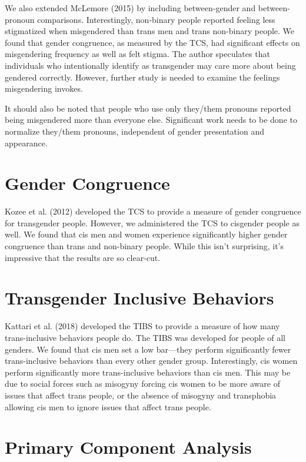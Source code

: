 \documentclass[12pt,twoside]{reedthesis}
\begin{document}
We also extended McLemore (2015) by including between-gender and between-pronoun comparisons. Interestingly, non-binary people reported feeling less stigmatized when misgendered than trans men and trans non-binary people. We found that gender congruence, as measured by the TCS, had significant effects on misgendering frequency as well as felt stigma. The author speculates that individuals who intentionally identify as transgender may care more about being gendered correctly. However, further study is needed to examine the feelings misgendering invokes.

It should also be noted that people who use only they/them pronouns reported being misgendered more than everyone else. Significant work needs to be done to normalize they/them pronouns, independent of gender presentation and appearance.

\hypertarget{gender-congruence-1}{%
\section{Gender Congruence}\label{gender-congruence-1}}

Kozee et al. (2012) developed the TCS to provide a measure of gender congruence for transgender people. However, we administered the TCS to cisgender people as well. We found that cis men and women experience significantly higher gender congruence than trans and non-binary people. While this isn't surprising, it's impressive that the results are so clear-cut.

\hypertarget{transgender-inclusive-behaviors-1}{%
\section{Transgender Inclusive Behaviors}\label{transgender-inclusive-behaviors-1}}

Kattari et al. (2018) developed the TIBS to provide a measure of how many trans-inclusive behaviors people do. The TIBS was developed for people of all genders. We found that cis men set a low bar---they perform significantly fewer trans-inclusive behaviors than every other gender group. Interestingly, cis women perform significantly more trans-inclusive behaviors than cis men. This may be due to social forces such as misogyny forcing cis women to be more aware of issues that affect trans people, or the absence of misogyny and transphobia allowing cis men to ignore issues that affect trans people.

\hypertarget{primary-component-analysis-1}{%
\section{Primary Component Analysis}\label{primary-component-analysis-1}}
\end{document}
